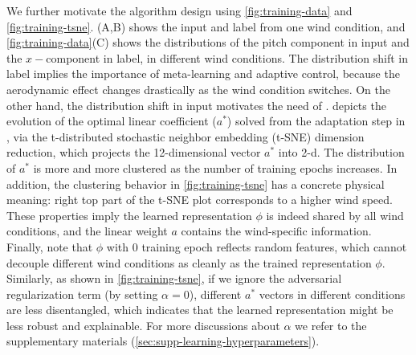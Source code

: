 We further motivate the algorithm design using \cref{fig:training-data} and \cref{fig:training-tsne}. (A,B) shows the input and label from one wind condition, and \cref{fig:training-data}(C) shows the distributions of the pitch component in input and the $x-$component in label, in different wind conditions. The distribution shift in label implies the importance of meta-learning and adaptive control, because the aerodynamic effect changes drastically as the wind condition switches. On the other hand, the distribution shift in input motivates the need of \DAML.  depicts the evolution of the optimal linear coefficient ($a^*$) solved from the adaptation step in \DAML, via the t-distributed stochastic neighbor embedding (t-SNE) dimension reduction, which projects the 12-dimensional vector $a^*$ into 2-d. The distribution of $a^*$ is more and more clustered as the number of training epochs increases. In addition, the clustering behavior in \cref{fig:training-tsne} has a concrete physical meaning: right top part of the t-SNE plot corresponds to a higher wind speed. These properties imply the learned representation $\phi$ is indeed shared by all wind conditions, and the linear weight $a$ contains the wind-specific information. Finally, note that $\phi$ with 0 training epoch reflects random features, which cannot decouple different wind conditions as cleanly as the trained representation $\phi$. Similarly, as shown in \cref{fig:training-tsne}, if we ignore the adversarial regularization term (by setting $\alpha=0$), different $a^*$ vectors in different conditions are less disentangled, which indicates that the learned representation might be less robust and explainable. 
For more discussions about $\alpha$ we refer to the supplementary materials (\ref{sec:supp-learning-hyperparameters}).

